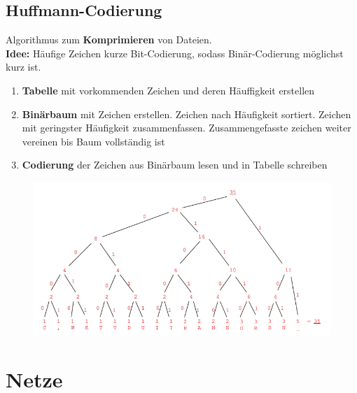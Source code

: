 \documentclass[12pt,a4paper]{article}
\begin{document}
		\subsection{Huffmann-Codierung}
			Algorithmus zum \textbf{Komprimieren} von Dateien.\\
			\textbf{Idee:} Häufige Zeichen kurze Bit-Codierung, sodass Binär-Codierung möglichst kurz ist.
			\begin{enumerate}
				\item \textbf{Tabelle} mit vorkommenden Zeichen und deren Häuffigkeit erstellen
				\item \textbf{Binärbaum} mit Zeichen erstellen. Zeichen nach Häufigkeit sortiert. Zeichen mit geringster Häufigkeit zusammenfassen. Zusammengefasste zeichen weiter vereinen bis Baum vollständig ist
				\item \textbf{Codierung} der Zeichen aus Binärbaum lesen und in Tabelle schreiben
			\end{enumerate}
			\begin{center}
				\begin{figure}[!h]
					\includegraphics[width=\textwidth]{Bilder/Huffmann-Baum.png}
				\end{figure}
			\end{center}

	\section{Netze}
\end{document}
